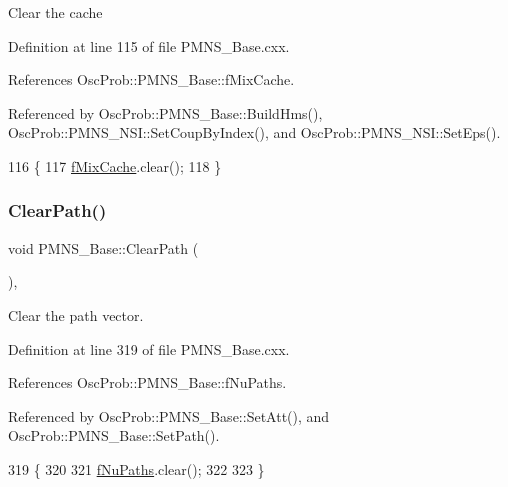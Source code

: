 Clear the cache 

Definition at line 115 of file P\+M\+N\+S\+\_\+\+Base.\+cxx.



References Osc\+Prob\+::\+P\+M\+N\+S\+\_\+\+Base\+::f\+Mix\+Cache.



Referenced by Osc\+Prob\+::\+P\+M\+N\+S\+\_\+\+Base\+::\+Build\+Hms(), Osc\+Prob\+::\+P\+M\+N\+S\+\_\+\+N\+S\+I\+::\+Set\+Coup\+By\+Index(), and Osc\+Prob\+::\+P\+M\+N\+S\+\_\+\+N\+S\+I\+::\+Set\+Eps().


\begin{DoxyCode}
116 \{
117   \hyperlink{classOscProb_1_1PMNS__Base_a8159424f20197a3a7145fe3bf2c11176}{fMixCache}.clear();
118 \}
\end{DoxyCode}
\mbox{\label{classOscProb_1_1PMNS__Base_aefe521239031c418cfaaaa550a6e13bb}} 
\subsubsection{\texorpdfstring{Clear\+Path()}{ClearPath()}}
{\footnotesize\ttfamily void P\+M\+N\+S\+\_\+\+Base\+::\+Clear\+Path (\begin{DoxyParamCaption}{ }\end{DoxyParamCaption})\hspace{0.3cm}{\ttfamily [virtual]}, {\ttfamily [inherited]}}

Clear the path vector. 

Definition at line 319 of file P\+M\+N\+S\+\_\+\+Base.\+cxx.



References Osc\+Prob\+::\+P\+M\+N\+S\+\_\+\+Base\+::f\+Nu\+Paths.



Referenced by Osc\+Prob\+::\+P\+M\+N\+S\+\_\+\+Base\+::\+Set\+Att(), and Osc\+Prob\+::\+P\+M\+N\+S\+\_\+\+Base\+::\+Set\+Path().


\begin{DoxyCode}
319                          \{
320 
321   \hyperlink{classOscProb_1_1PMNS__Base_a69db9d57e12fc7cbe0431bc6c18fac93}{fNuPaths}.clear();
322 
323 \}
\end{DoxyCode}
\mbox{\label{classOscProb_1_1PMNS__Deco_aca391ff02be7abc2fd3dba40e9ce2665}} 
